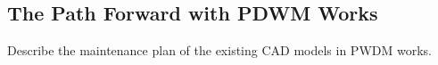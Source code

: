 \subsection{The Path Forward with PDWM Works}

Describe the maintenance plan of the existing CAD models in PWDM works.